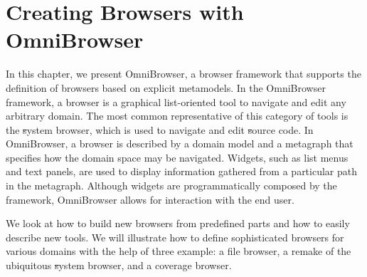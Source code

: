 \documentclass[a4paper,10pt,twoside]{book}
\begin{document}
	\sloppy
\fi

\newcommand{\ob}{Omni\-Brow\-ser\xspace}
\newcommand{\obf}{Omni\-Brow\-ser framework\xspace}
\newcommand{\applflab}{ApplFLab\xspace}



\chapter{Creating Browsers with OmniBrowser}


\noindent
In this chapter, we present \ob, a browser framework that supports the definition of browsers based on explicit metamodels. In the \obf, a browser is a graphical list-oriented tool to navigate and edit any arbitrary domain. The most common representative of this category of tools is the \st system browser, which is used to navigate and edit \st source code.
In \ob, a browser is described by a domain model and a metagraph that specifies how the domain space may be navigated. Widgets, such as list menus and text panels, are used to display information gathered from a particular path in the metagraph. Although widgets are programmatically composed by the framework, \ob allows for interaction with the end user.


We look at how to build new browsers from predefined parts and how to easily describe new tools. We will illustrate how to define sophisticated browsers for various domains with the help of three example: a file browser, a remake of the ubiquitous \st system browser, and a coverage browser.

\end{document}
